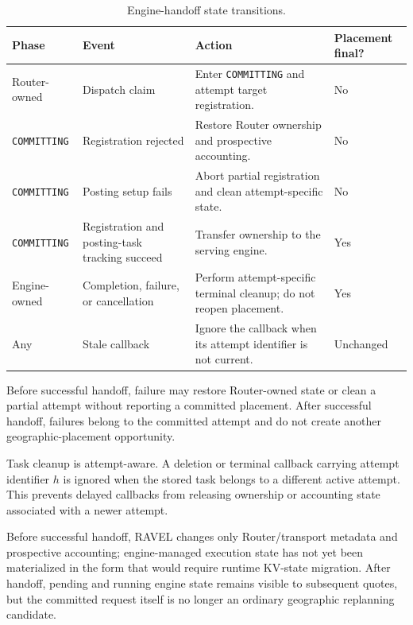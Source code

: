 \begin{table}[t]
    \centering
    \small
    \caption{Engine-handoff state transitions.}
    \label{tab:appendix:handoff-state-machine}
    \begin{tabular}{
        p{}
        p{}
        p{}
        p{}}
        \toprule
        \textbf{Phase} &
        \textbf{Event} &
        \textbf{Action} &
        \textbf{Placement final?} \\
        \midrule

        Router-owned &
        Dispatch claim &
        Enter \texttt{COMMITTING} and attempt target registration. &
        No \\

        \texttt{COMMITTING} &
        Registration rejected &
        Restore Router ownership and prospective accounting. &
        No \\

        \texttt{COMMITTING} &
        Posting setup fails &
        Abort partial registration and clean attempt-specific state. &
        No \\

        \texttt{COMMITTING} &
        Registration and posting-task tracking succeed &
        Transfer ownership to the serving engine. &
        Yes \\

        Engine-owned &
        Completion, failure, or cancellation &
        Perform attempt-specific terminal cleanup; do not reopen placement. &
        Yes \\

        Any &
        Stale callback &
        Ignore the callback when its attempt identifier is not current. &
        Unchanged \\

        \bottomrule
    \end{tabular}
\end{table}

Before successful handoff, failure may restore Router-owned state or clean a
partial attempt without reporting a committed placement.
After successful handoff, failures belong to the committed attempt and do not
create another geographic-placement opportunity.

Task cleanup is attempt-aware.
A deletion or terminal callback carrying attempt identifier $h$ is ignored
when the stored task belongs to a different active attempt.
This prevents delayed callbacks from releasing ownership or accounting state
associated with a newer attempt.

Before successful handoff, RAVEL changes only Router/transport metadata and
prospective accounting; engine-managed execution state has not yet been
materialized in the form that would require runtime KV-state migration.
After handoff, pending and running engine state remains visible to subsequent
quotes, but the committed request itself is no longer an ordinary geographic
replanning candidate.


